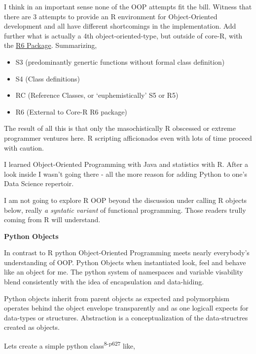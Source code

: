 \documentclass[]{book}
\providecommand{\tightlist}{%
  \setlength{\itemsep}{0pt}\setlength{\parskip}{0pt}}
\theoremstyle{definition}
\theoremstyle{definition}
\theoremstyle{definition}
\theoremstyle{remark}
\begin{document}
I think in an important sense none of the OOP attempts fit the bill.
Witness that there are 3 attempts to provide an R environment for
Object-Oriented development and all have different shortcomings in the
implementation. Add further what is actually a 4th object-oriented-type,
but outside of core-R, with the \href{https://github.com/r-lib/R6/}{R6
Package}. Summarizing,

\begin{itemize}
\tightlist
\item
  S3 (predominantly genertic functions without formal class definition)
\item
  S4 (Class definitions)
\item
  RC (Reference Classes, or `euphemistically' S5 or R5)
\item
  R6 (External to Core-R R6 package)
\end{itemize}

The result of all this is that only the masochistically R obscessed or
extreme programmer ventures here. R scripting afficionados even with
lots of time proceed with caution.

I learned Object-Oriented Programming with Java and statistics with R.
After a look inside I wasn't going there - all the more reason for
adding Python to one's Data Science repertoir.

I am not going to explore R OOP beyond the discussion under calling R
objects below, really \emph{a syntatic variant} of functional
programming. Those readers trully coming from R will understand.

\textbf{Python Objects}

In contrast to R python Object-Oriented Programming meets nearly
everybody's understanding of OOP. Python Objects when instantiated look,
feel and behave like an object for me. The python system of namespaces
and variable visability blend consistently with the idea of
encapsulation and data-hiding.

Python objects inherit from parent objects as expected and polymorphism
operates behind the object envelope transparently and as one logicall
expects for data-types or structures. Abstraction is a conceptualization
of the data-structres created as objects.

Lets create a simple python class\textsuperscript{8-p627} like,
\end{document}
